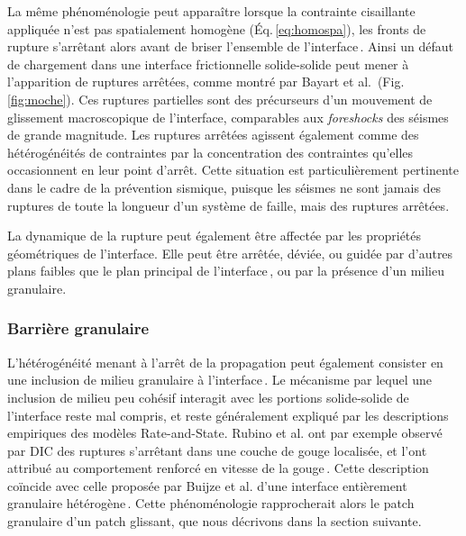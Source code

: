 La même phénoménologie peut apparaître lorsque la contrainte cisaillante appliquée n'est pas spatialement homogène (Éq.\,\ref{eq:homospa}), les fronts de rupture s'arrêtant alors avant de briser l'ensemble de l'interface\,\cite{kammer_linear_2015,
radiguet_survival_2013,
rubinstein_dynamics_2007,
scheibert_role_2010,
bayart_rupture_2018,
taloni_scalar_2015}. Ainsi un défaut de chargement dans une interface frictionnelle solide-solide peut mener à l'apparition de ruptures arrêtées, comme montré par Bayart et al.\,\cite{bayart_fracture_2016} (Fig.\,\ref{fig:moche}). Ces ruptures partielles sont des précurseurs d'un mouvement de glissement macroscopique de l'interface, comparables aux \textit{foreshocks} des séismes de grande magnitude. Les ruptures arrêtées agissent également comme des hétérogénéités de contraintes par la concentration des contraintes qu'elles occasionnent en leur point d'arrêt. Cette situation est particulièrement pertinente dans le cadre de la prévention sismique, puisque les séismes ne sont jamais des ruptures de toute la longueur d'un système de faille, mais des ruptures arrêtées.

La dynamique de la rupture peut également être affectée par les propriétés géométriques de l'interface. Elle peut être arrêtée, déviée, ou guidée par d'autres plans faibles que le plan principal de l'interface\,\cite{gudmundsson_effects_2010}, ou par la présence d'un milieu granulaire.





\subsubsection{Barrière granulaire}


L'hétérogénéité menant à l'arrêt de la propagation peut également consister en une inclusion de milieu granulaire à l'interface\,\cite{rubino_intermittent_2022,buijze_nucleation_2020,buijze_effects_2021}. Le mécanisme par lequel une inclusion de milieu peu cohésif interagit avec les portions solide-solide de l'interface reste mal compris, et reste généralement expliqué par les descriptions empiriques des modèles Rate-and-State. Rubino et al. ont par exemple observé par DIC des ruptures s’arrêtant dans une couche de gouge localisée, et l'ont attribué au comportement renforcé en vitesse de la gouge\,\cite{rubino_intermittent_2022}. Cette description coïncide avec celle proposée par Buijze et al. d'une interface entièrement granulaire hétérogène\,\cite{buijze_nucleation_2020}. Cette phénoménologie rapprocherait alors le patch granulaire d'un patch glissant, que nous décrivons dans la section suivante.

